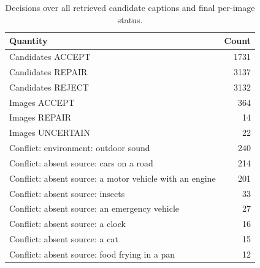 \begin{table}[t]
\centering
\caption{Decisions over all retrieved candidate captions and final per-image status.}
\label{tab:table4_verification}
\begin{tabular}{lr}
\toprule
Quantity & Count \\
\midrule
Candidates ACCEPT & 1731 \\
Candidates REPAIR & 3137 \\
Candidates REJECT & 3132 \\
Images ACCEPT & 364 \\
Images REPAIR & 14 \\
Images UNCERTAIN & 22 \\
Conflict: environment: outdoor sound & 240 \\
Conflict: absent source: cars on a road & 214 \\
Conflict: absent source: a motor vehicle with an engine & 201 \\
Conflict: absent source: insects & 33 \\
Conflict: absent source: an emergency vehicle & 27 \\
Conflict: absent source: a clock & 16 \\
Conflict: absent source: a cat & 15 \\
Conflict: absent source: food frying in a pan & 12 \\
\bottomrule
\end{tabular}
\end{table}
